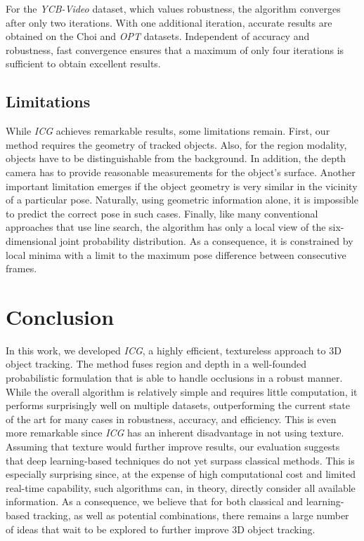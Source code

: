 \documentclass[10pt,twocolumn,letterpaper]{article}
\begin{document}
For the \textit{YCB-Video} dataset, which values robustness, the algorithm converges after only two iterations.
With one additional iteration, accurate results are obtained on the Choi and \textit{OPT} datasets.
Independent of accuracy and robustness, fast convergence ensures that a maximum of only four iterations is sufficient to obtain excellent results.



\subsection{Limitations}\label{ssec:e4}
While \textit{ICG} achieves remarkable results, some limitations remain.
First, our method requires the geometry of tracked objects.
Also, for the region modality, objects have to be distinguishable from the background.
In addition, the depth camera has to provide reasonable measurements for the object's surface.
Another important limitation emerges if the object geometry is very similar in the vicinity of a particular pose.
Naturally, using geometric information alone, it is impossible to predict the correct pose in such cases.
Finally, like many conventional approaches that use line search, the algorithm has only a local view of the six-dimensional joint probability distribution.
As a consequence, it is constrained by local minima with a limit to the maximum pose difference between consecutive frames.

 

\section{Conclusion}\label{sec:c}

In this work, we developed \textit{ICG}, a highly efficient, textureless approach to 3D object tracking.
The method fuses region and depth in a well-founded probabilistic formulation that is able to handle occlusions in a robust manner.
While the overall algorithm is relatively simple and requires little computation, it performs surprisingly well on multiple datasets, outperforming the current state of the art for many cases in robustness, accuracy, and efficiency.
This is even more remarkable since \textit{ICG} has an inherent disadvantage in not using texture.
Assuming that texture would further improve results, our evaluation suggests that deep learning-based techniques do not yet surpass classical methods.
This is especially surprising since, at the expense of high computational cost and limited real-time capability, such algorithms can, in theory, directly consider all available information.
As a consequence, we believe that for both classical and learning-based tracking, as well as potential combinations, there remains a large number of ideas that wait to be explored to further improve 3D object tracking.
\end{document}
